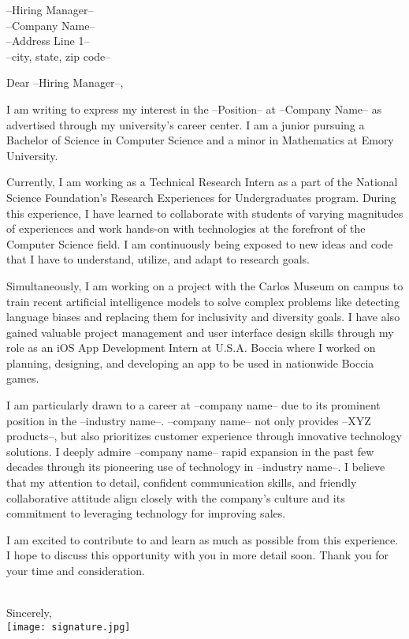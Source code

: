 \documentclass[letterpaper,12pt]{letter}
\date{}
\begin{document}
\begin{letter}{%
    --Hiring Manager-- \\ 
    --Company Name-- \\ 
    --Address Line 1-- \\
    --city, state, zip code--
}

\opening{Dear --Hiring Manager--,}

I am writing to express my interest in the --Position-- at --Company Name-- 
as advertised through my university's career center. I am a junior pursuing a Bachelor of Science 
in Computer Science and a minor in Mathematics at Emory University.

Currently, I am working as a Technical Research Intern as a part of the National Science Foundation's 
Research Experiences for Undergraduates program. During this experience, I have learned to 
collaborate with students of varying magnitudes of experiences and work hands-on with technologies at 
the forefront of the Computer Science field. I am continuously being exposed to new ideas 
and code that I have to understand, utilize, and adapt to research goals. 

Simultaneously, I am working on a project with the Carlos Museum on campus to train recent 
artificial intelligence models to solve complex problems like detecting language biases and 
replacing them for inclusivity and diversity goals. I have also gained valuable project management 
and user interface design skills through my role as an iOS App Development Intern at U.S.A. Boccia 
where I worked on planning, designing, and developing an app to be used in nationwide Boccia games. 

I am particularly drawn to a career at --company name-- due to its prominent position in the --industry name--. 
--company name-- not only provides --XYZ products--, but also prioritizes customer experience through 
innovative technology solutions. I deeply admire --company name-- rapid expansion in the past few decades through its
pioneering use of technology in --industry name--. I believe that my attention to detail, confident communication skills,
and friendly collaborative attitude align closely with the company’s culture and its commitment to leveraging
technology for improving sales.

I am excited to contribute to and learn as much as possible from this experience. I hope to discuss
this opportunity with you in more detail soon. Thank you for your time and consideration. \\\\

\closing{Sincerely, \\
\vspace{10pt}
\texttt{[image: signature.jpg]}}


\end{letter}

\end{document}
